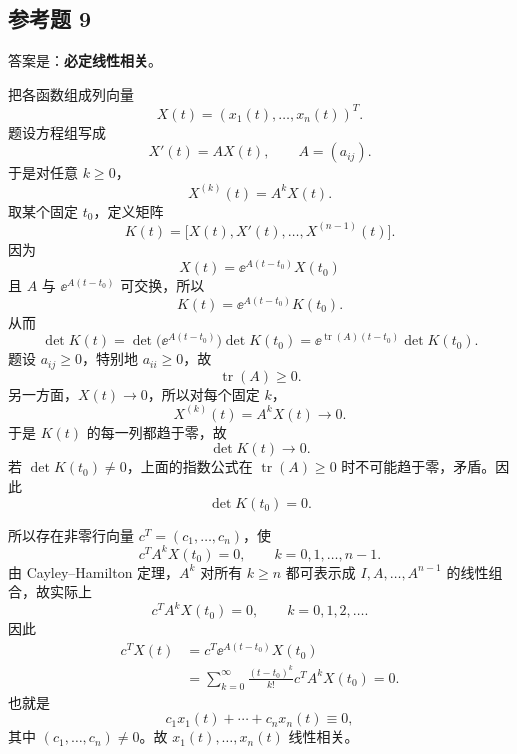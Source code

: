 \subsection*{参考题 9}
\begin{xsolution}
答案是：\textbf{必定线性相关}。

把各函数组成列向量
\[
  X(t)=(x_1(t),\ldots,x_n(t))^T.
\]
题设方程组写成
\[
  X'(t)=AX(t),
  \qquad A=(a_{ij}).
\]
于是对任意 $k\ge0$，
\[
  X^{(k)}(t)=A^kX(t).
\]
取某个固定 $t_0$，定义矩阵
\[
  K(t)=\bigl[X(t),X'(t),\ldots,X^{(n-1)}(t)\bigr].
\]
因为
\[
  X(t)=\ee^{A(t-t_0)}X(t_0)
\]
且 $A$ 与 $\ee^{A(t-t_0)}$ 可交换，所以
\[
  K(t)=\ee^{A(t-t_0)}K(t_0).
\]
从而
\[
  \det K(t)
  =\det\bigl(\ee^{A(t-t_0)}\bigr)\det K(t_0)
  =\ee^{\operatorname{tr}(A)(t-t_0)}\det K(t_0).
\]
题设 $a_{ij}\ge0$，特别地 $a_{ii}\ge0$，故
\[
  \operatorname{tr}(A)\ge0.
\]
另一方面，$X(t)\to0$，所以对每个固定 $k$，
\[
  X^{(k)}(t)=A^kX(t)\to0.
\]
于是 $K(t)$ 的每一列都趋于零，故
\[
  \det K(t)\to0.
\]
若 $\det K(t_0)\ne0$，上面的指数公式在 $\operatorname{tr}(A)\ge0$ 时不可能趋于零，矛盾。因此
\[
  \det K(t_0)=0.
\]

所以存在非零行向量 $c^T=(c_1,\ldots,c_n)$，使
\[
  c^TA^kX(t_0)=0,
  \qquad k=0,1,\ldots,n-1.
\]
由 Cayley--Hamilton 定理，$A^k$ 对所有 $k\ge n$ 都可表示成 $I,A,\ldots,A^{n-1}$ 的线性组合，故实际上
\[
  c^TA^kX(t_0)=0,
  \qquad k=0,1,2,\ldots.
\]
因此
\begin{align*}
  c^TX(t)
  &=c^T\ee^{A(t-t_0)}X(t_0)\\
  &=\sum_{k=0}^\infty
    \frac{(t-t_0)^k}{k!}c^TA^kX(t_0)=0.
\end{align*}
也就是
\[
  c_1x_1(t)+\cdots+c_nx_n(t)\equiv0,
\]
其中 $(c_1,\ldots,c_n)\ne0$。故 $x_1(t),\ldots,x_n(t)$ 线性相关。
\end{xsolution}

